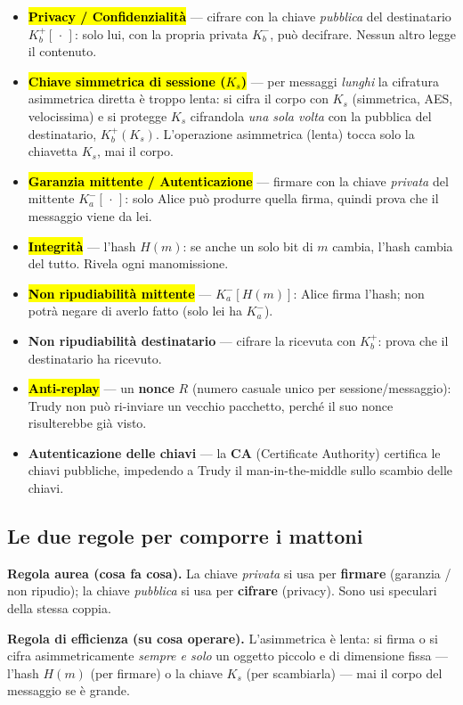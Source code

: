 \documentclass[11pt,a4paper]{report}
\begin{document}
\begin{itemize}
\item \hl{\textbf{Privacy / Confidenzialità}} --- cifrare con la chiave
\emph{pubblica} del destinatario $K_b^+[\,\cdot\,]$: solo lui, con la propria
privata $K_b^-$, può decifrare. Nessun altro legge il contenuto.
\item \hl{\textbf{Chiave simmetrica di sessione ($K_s$)}} --- per messaggi
\emph{lunghi} la cifratura asimmetrica diretta è troppo lenta: si cifra il corpo
con $K_s$ (simmetrica, AES, velocissima) e si protegge $K_s$ cifrandola
\emph{una sola volta} con la pubblica del destinatario, $K_b^+(K_s)$. L'operazione
asimmetrica (lenta) tocca solo la chiavetta $K_s$, mai il corpo.
\item \hl{\textbf{Garanzia mittente / Autenticazione}} --- firmare con la chiave
\emph{privata} del mittente $K_a^-[\,\cdot\,]$: solo Alice può produrre quella
firma, quindi prova che il messaggio viene da lei.
\item \hl{\textbf{Integrità}} --- l'hash $H(m)$: se anche un solo bit di $m$
cambia, l'hash cambia del tutto. Rivela ogni manomissione.
\item \hl{\textbf{Non ripudiabilità mittente}} --- $K_a^-[H(m)]$: Alice firma
l'hash; non potrà negare di averlo fatto (solo lei ha $K_a^-$).
\item \textbf{Non ripudiabilità destinatario} --- cifrare la ricevuta con $K_b^+$:
prova che il destinatario ha ricevuto.
\item \hl{\textbf{Anti-replay}} --- un \textbf{nonce} $R$ (numero casuale unico per
sessione/messaggio): Trudy non può ri-inviare un vecchio pacchetto, perché il suo
nonce risulterebbe già visto.
\item \textbf{Autenticazione delle chiavi} --- la \textbf{CA} (Certificate
Authority) certifica le chiavi pubbliche, impedendo a Trudy il man-in-the-middle
sullo scambio delle chiavi.
\end{itemize}

\subsection{Le due regole per comporre i mattoni}

\textbf{Regola aurea (cosa fa cosa).} La chiave \emph{privata} si usa per
\textbf{firmare} (garanzia / non ripudio); la chiave \emph{pubblica} si usa per
\textbf{cifrare} (privacy). Sono usi speculari della stessa coppia.

\textbf{Regola di efficienza (su cosa operare).} L'asimmetrica è lenta: si firma o
si cifra asimmetricamente \emph{sempre e solo} un oggetto piccolo e di dimensione
fissa --- l'hash $H(m)$ (per firmare) o la chiave $K_s$ (per scambiarla) --- mai
il corpo del messaggio se è grande.
\end{document}
